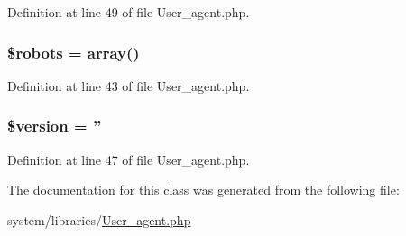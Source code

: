 Definition at line 49 of file User\-\_\-agent.\-php.

\hypertarget{class_c_i___user__agent_a5752e2a66d1c03bc34666492746037ab}{
\subsubsection[{\$robots}]{\setlength{\rightskip}{0pt plus 5cm}\$robots = array()}}\label{class_c_i___user__agent_a5752e2a66d1c03bc34666492746037ab}


Definition at line 43 of file User\-\_\-agent.\-php.

\hypertarget{class_c_i___user__agent_a17c8948c68aa44fa9961ae169b6a8961}{
\subsubsection[{\$version}]{\setlength{\rightskip}{0pt plus 5cm}\${\bf version} = ''}}\label{class_c_i___user__agent_a17c8948c68aa44fa9961ae169b6a8961}


Definition at line 47 of file User\-\_\-agent.\-php.



The documentation for this class was generated from the following file\-:\begin{DoxyCompactItemize}
\item 
system/libraries/\hyperlink{_user__agent_8php}{User\-\_\-agent.\-php}\end{DoxyCompactItemize}
